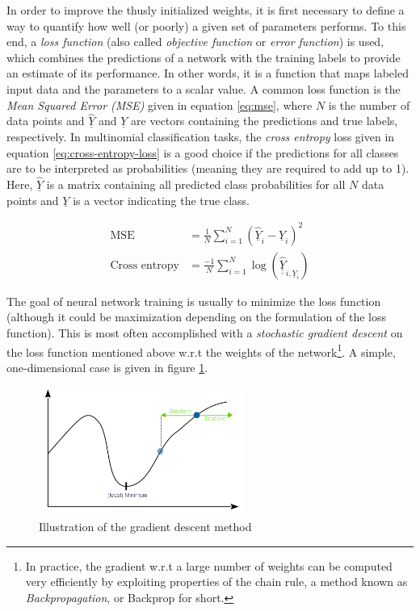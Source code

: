 \documentclass[11pt, a4paper]{article}
\newcommand\braces[1]{\left(#1\right)}
\renewcommand{\vec}[1]{\underline{#1}}
\newcommand{\mat}[1]{\underline{\underline{#1}}}
\begin{document}
In order to improve the thusly initialized weights, it is first necessary to define a way to quantify how well (or poorly) a given set of parameters performs. To this end, a \emph{loss function} (also called \emph{objective function} or \emph{error function}) is used, which combines the predictions of a network with the training labels to provide an estimate of its performance. In other words, it is a function that maps labeled input data and the parameters to a scalar value. A common loss function is the \emph{Mean Squared Error (MSE)} given in equation \eqref{eq:mse}, where $N$ is the number of data points and $\vec{\hat Y}$ and $\vec{Y}$ are vectors containing the predictions and true labels, respectively. In multinomial classification tasks, the \emph{cross entropy} loss given in equation \eqref{eq:cross-entropy-loss} \cite{caffe-cross-entropy} is a good choice if the predictions for all classes are to be interpreted as probabilities (meaning they are required to add up to 1). Here, $\vec{\hat Y}$ is a matrix containing all predicted class probabilities for all $N$ data points and $\vec{Y}$ is a vector indicating the true class.

\begin{align}
	\text{MSE} &= \frac{1}{N} \sum_{i=1}^N \braces{\vec{\hat Y}_i - \vec{Y}_i}^2 \label{eq:mse} \\
	\text{Cross entropy} &= \frac{-1}{N} \sum_{i=1}^N \log{\braces{\mat{\hat Y}_{i, \vec{Y}_i}}} \label{eq:cross-entropy-loss}
\end{align}

The goal of neural network training is usually to minimize the loss function (although it could be maximization depending on the formulation of the loss function). This is most often accomplished with a \emph{stochastic gradient descent} \cite{stochastic-gradient-descent-learning-neural-networks} on the loss function mentioned above w.r.t the weights of the network\footnote{In practice, the gradient w.r.t a large number of weights can be computed very efficiently by exploiting properties of the chain rule, a method known as \emph{Backpropagation}, or Backprop for short.}. A simple, one-dimensional case is given in figure \ref{fig:gradient-descent}.

\begin{figure}[h!tb]
	\centering
	\includegraphics[width=0.6\textwidth]{images/gradient_descent.png}
	\caption[Gradient descent method]{Illustration of the gradient descent method}
	\label{fig:gradient-descent}
\end{figure}
\end{document}
